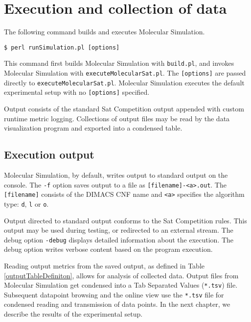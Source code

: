 	\section{Execution and collection of data}


The following command builds and executes Molecular Simulation.

\begin{center}
\texttt{\$ perl runSimulation.pl [options]}
\end{center}

This command first builds Molecular Simulation with \texttt{build.pl}, and invokes Molecular Simulation with \texttt{executeMolecularSat.pl}.  The \texttt{[options]} are passed directly to \texttt{executeMolecularSat.pl}.  Molecular Simulation executes the default experimental setup with no \texttt{[options]} specified.

Output consists of the standard {\sc Sat} Competition output appended with custom runtime metric logging.  Collections of output files may be read by the data visualization program and exported into a condensed table. 

		\subsection{Execution output}


	Molecular Simulation, by default, writes output to standard output on the console.  The \texttt{-f} option saves output to a file as \texttt{[filename]-<a>.out}.  The \texttt{[filename]} consists of the DIMACS CNF name and \texttt{<a>} specifies the algorithm type: \texttt{d}, \texttt{l} or \texttt{o}.

	Output directed to standard output conforms to the {\sc Sat} Competition rules.  This output may be used during testing, or redirected to an external stream.  The debug option \texttt{-debug} displays detailed information about the execution.  The debug option writes verbose content based on the program execution.  

	Reading output metrics from the saved output, as defined in Table \ref{outputTableDefiniton}, allows for analysis of collected data.  Output files from Molecular Simulation get condensed into a Tab Separated Values (\texttt{*.tsv}) file.  Subsequent datapoint browsing and the online view use the \texttt{*.tsv} file for condensed reading and transmission of data points.  In the next chapter, we describe the results of the experimental setup.
